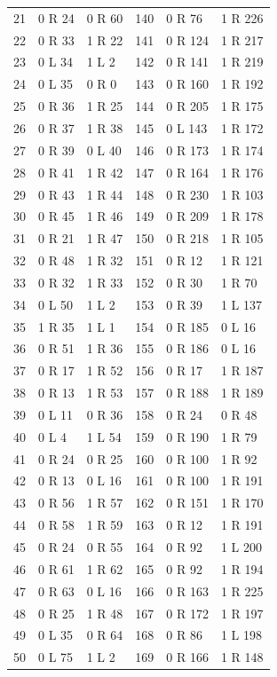 \begin{center}
\begin{longtable}{rll@{\qquad}rll}
21 & 0 R 24 & 0 R 60 & 140 & 0 R 76 & 1 R 226\\
22 & 0 R 33 & 1 R 22 & 141 & 0 R 124 & 1 R 217\\
23 & 0 L 34 & 1 L 2 & 142 & 0 R 141 & 1 R 219\\
24 & 0 L 35 & 0 R 0 & 143 & 0 R 160 & 1 R 192\\
25 & 0 R 36 & 1 R 25 & 144 & 0 R 205 & 1 R 175\\
26 & 0 R 37 & 1 R 38 & 145 & 0 L 143 & 1 R 172\\
27 & 0 R 39 & 0 L 40 & 146 & 0 R 173 & 1 R 174\\
28 & 0 R 41 & 1 R 42 & 147 & 0 R 164 & 1 R 176\\
29 & 0 R 43 & 1 R 44 & 148 & 0 R 230 & 1 R 103\\
30 & 0 R 45 & 1 R 46 & 149 & 0 R 209 & 1 R 178\\
31 & 0 R 21 & 1 R 47 & 150 & 0 R 218 & 1 R 105\\
32 & 0 R 48 & 1 R 32 & 151 & 0 R 12 & 1 R 121\\
33 & 0 R 32 & 1 R 33 & 152 & 0 R 30 & 1 R 70\\
34 & 0 L 50 & 1 L 2 & 153 & 0 R 39 & 1 L 137\\
35 & 1 R 35 & 1 L 1 & 154 & 0 R 185 & 0 L 16\\
36 & 0 R 51 & 1 R 36 & 155 & 0 R 186 & 0 L 16\\
37 & 0 R 17 & 1 R 52 & 156 & 0 R 17 & 1 R 187\\
38 & 0 R 13 & 1 R 53 & 157 & 0 R 188 & 1 R 189\\
39 & 0 L 11 & 0 R 36 & 158 & 0 R 24 & 0 R 48\\
40 & 0 L 4 & 1 L 54 & 159 & 0 R 190 & 1 R 79\\
41 & 0 R 24 & 0 R 25 & 160 & 0 R 100 & 1 R 92\\
42 & 0 R 13 & 0 L 16 & 161 & 0 R 100 & 1 R 191\\
43 & 0 R 56 & 1 R 57 & 162 & 0 R 151 & 1 R 170\\
44 & 0 R 58 & 1 R 59 & 163 & 0 R 12 & 1 R 191\\
45 & 0 R 24 & 0 R 55 & 164 & 0 R 92 & 1 L 200\\
46 & 0 R 61 & 1 R 62 & 165 & 0 R 92 & 1 R 194\\
47 & 0 R 63 & 0 L 16 & 166 & 0 R 163 & 1 R 225\\
48 & 0 R 25 & 1 R 48 & 167 & 0 R 172 & 1 R 197\\
49 & 0 L 35 & 0 R 64 & 168 & 0 R 86 & 1 L 198\\
50 & 0 L 75 & 1 L 2 & 169 & 0 R 166 & 1 R 148\\

\end{longtable}
\end{center}
